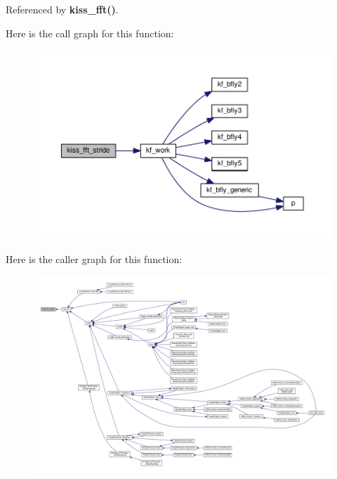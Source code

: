Referenced by {\bf kiss\+\_\+fft()}.



Here is the call graph for this function\+:
\nopagebreak
\begin{figure}[H]
\begin{center}
\leavevmode
\includegraphics[width=350pt]{d3/d69/kiss__fft_8c_aec345dab68815f4c5c2904978626d877_cgraph}
\end{center}
\end{figure}




Here is the caller graph for this function\+:
\nopagebreak
\begin{figure}[H]
\begin{center}
\leavevmode
\includegraphics[width=350pt]{d3/d69/kiss__fft_8c_aec345dab68815f4c5c2904978626d877_icgraph}
\end{center}
\end{figure}


